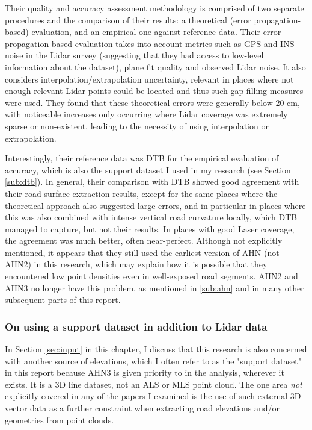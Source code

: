 Their quality and accuracy assessment methodology is comprised of two separate procedures and the comparison of their results: a theoretical (error propagation-based) evaluation, and an empirical one against reference data. Their error propagation-based evaluation takes into account metrics such as GPS and INS noise in the Lidar survey (suggesting that they had access to low-level information about the dataset), plane fit quality and observed Lidar noise. It also considers interpolation/extrapolation uncertainty, relevant in places where not enough relevant Lidar points could be located and thus such gap-filling measures were used. They found that these theoretical errors were generally below 20 cm, with noticeable increases only occurring where Lidar coverage was extremely sparse or non-existent, leading to the necessity of using interpolation or extrapolation. 

Interestingly, their reference data was DTB for the empirical evaluation of accuracy, which is also the support dataset I used in my research (see Section \ref{sub:dtb}). In general, their comparison with DTB showed good agreement with their road surface extraction results, except for the same places where the theoretical approach also suggested large errors, and in particular in places where this was also combined with intense vertical road curvature locally, which DTB managed to capture, but not their results. In places with good Laser coverage, the agreement was much better, often near-perfect. Although not explicitly mentioned, it appears that they still used the earliest version of AHN (not AHN2) in this research, which may explain how it is possible that they encountered low point densities even in well-exposed road segments. AHN2 and AHN3 no longer have this problem, as mentioned in \ref{sub:ahn} and in many other subsequent parts of this report.

\subsubsection{On using a support dataset in addition to Lidar data}

In Section \ref{sec:input} in this chapter, I discuss that this research is also concerned with  another source of elevations, which I often refer to as the "support dataset" in this report because AHN3 is given priority to in the analysis, wherever it exists. It is a 3D line dataset, not an ALS or MLS point cloud. The one area \textit{not} explicitly covered in any of the papers I examined is the use of such external 3D vector data as a further constraint when extracting road elevations and/or geometries from point clouds.

